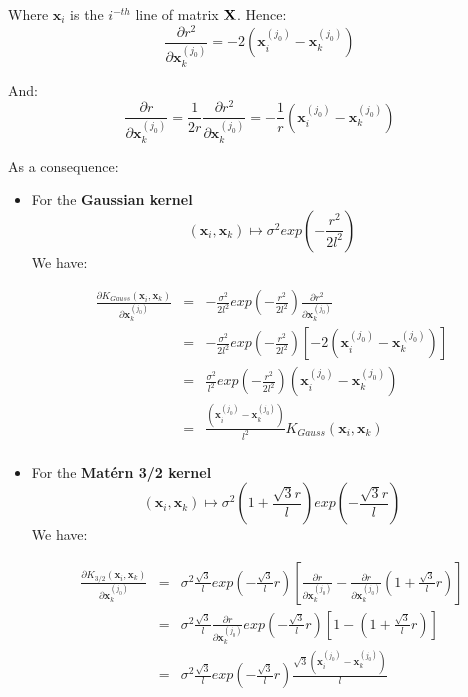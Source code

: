 Where $\textbf{x}_i$ is the $i^{-th}$ line of matrix ${\bf X}$. Hence:
$$
\frac{\partial r^2}{\partial \textbf{x}_k^{(j_0)}} = -2\left(\textbf{x}_i^{(j_0)} - \textbf{x}_k^{(j_0)} \right)
$$

And:
$$
\frac{\partial r}{\partial \textbf{x}_k^{(j_0)}} = \frac{1}{2r}\frac{\partial r^2}{\partial \textbf{x}_k^{(j_0)}} = -\frac{1}{r}\left(\textbf{x}_i^{(j_0)} - \textbf{x}_k^{(j_0)} \right)
$$


As a consequence: 

\begin{itemize}

\item For the \textbf{Gaussian kernel} 
$$
(\textbf{x}_i, \textbf{x}_k) \mapsto \sigma^2 exp \left( -\frac{r^2}{2l^2} \right)
$$ 
We have:

\begin{eqnarray*}
\frac{\partial K_{Gauss}(\textbf{x}_i, \textbf{x}_k)}{\partial \textbf{x}_k^{(j_0)}} &=& -\frac{\sigma^2}{2l^2} exp \left(-\frac{r^2}{2l^2} \right) \frac{\partial r^2}{\partial \textbf{x}_k^{(j_0)}}\\
&=& -\frac{\sigma^2}{2l^2} exp \left(-\frac{r^2}{2l^2} \right) \left[ -2\left(\textbf{x}_i^{(j_0)} - \textbf{x}_k^{(j_0)} \right) \right]\\
&=& \frac{\sigma^2}{l^2} exp \left(-\frac{r^2}{2l^2} \right) \left(\textbf{x}_i^{(j_0)} - \textbf{x}_k^{(j_0)} \right) \\
&=& \frac{\left(\textbf{x}_i^{(j_0)} - \textbf{x}_k^{(j_0)} \right)}{l^2} K_{Gauss}(\textbf{x}_i, \textbf{x}_k)\\
\end{eqnarray*}

\item For the \textbf{Mat\'ern 3/2 kernel} 
$$
(\textbf{x}_i, \textbf{x}_k) \mapsto \sigma^2 \left( 1 + \frac{\sqrt{3}r}{l} \right) exp \left( - \frac{\sqrt{3}r}{l} \right)
$$ 
We have:

\begin{eqnarray*}
\frac{\partial K_{3/2}(\textbf{x}_i, \textbf{x}_k)}{\partial \textbf{x}_k^{(j_0)}} &=& \sigma^2 \frac{\sqrt{3}}{l} exp \left( - \frac{\sqrt{3}}{l} r\right) \left[   \frac{\partial r}{\partial \textbf{x}_k^{(j_0)}}  - \frac{\partial r}{\partial \textbf{x}_k^{(j_0)}} \left( 1 + \frac{\sqrt{3}}{l}r \right) \right]\\
&=&  \sigma^2 \frac{\sqrt{3}}{l} \frac{\partial r}{\partial \textbf{x}_k^{(j_0)}} exp \left( - \frac{\sqrt{3}}{l} r\right) \left[1  -  \left( 1 + \frac{\sqrt{3}}{l}r \right) \right]\\
&=& \sigma^2 \frac{\sqrt{3}}{l} exp \left( - \frac{\sqrt{3}}{l} r\right) \frac{\sqrt{3}\left(\textbf{x}_i^{(j_0)} - \textbf{x}_k^{(j_0)} \right)}{l} \\
\end{eqnarray*}


\end{itemize}
